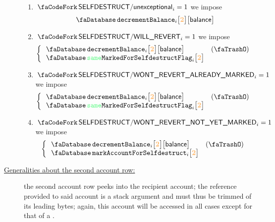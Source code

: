 \begin{description}
\begin{enumerate}
			\item \If $\scenSelfdestructUnexceptional_{i} = 1$ \Then we impose
				\[
					\accDecrementBalance {i}{\locFirstAccountRow}{\locBalance}
				\]
			\item \If $\scenSelfdestructWillRevert _{i} = 1$ \Then we impose
				\[
					\left\{ \begin{array}{lr}
						\accDecrementBalance                {i}{\locFirstAccountRow}{\locBalance} & (\trash) \\
						\accSameMarkedForSelfdestructFlag   {i}{\locFirstAccountRow} \\
					\end{array} \right.
				\]
			\item \If $\scenSelfdestructWontRevertAlreadyMarked _{i} = 1$ \Then we impose
				\[
					\left\{ \begin{array}{lr}
						\accDecrementBalance                {i}{\locFirstAccountRow}{\locBalance} & (\trash) \\
						\accSameMarkedForSelfdestructFlag   {i}{\locFirstAccountRow} \\
					\end{array} \right.
				\]
			\item \If $\scenSelfdestructWontRevertNotYetMarked _{i} = 1$ \Then we impose
				\[
					\left\{ \begin{array}{lr}
						\accDecrementBalance                {i}{\locFirstAccountRow}{\locBalance} & (\trash) \\
						\accTurnOnMarkedForSelfdestructFlag {i}{\locFirstAccountRow} \\
					\end{array} \right.
				\]
		\end{enumerate}
	\item[\underline{Generalities about the second account row:}]
		the second account row peeks into the recipient account;
		the reference provided to said account is a stack argument and must thus be trimmed of its leading bytes;
		again, this account will be accessed in all cases except for that of a \staticxSH{}.


\end{description}
